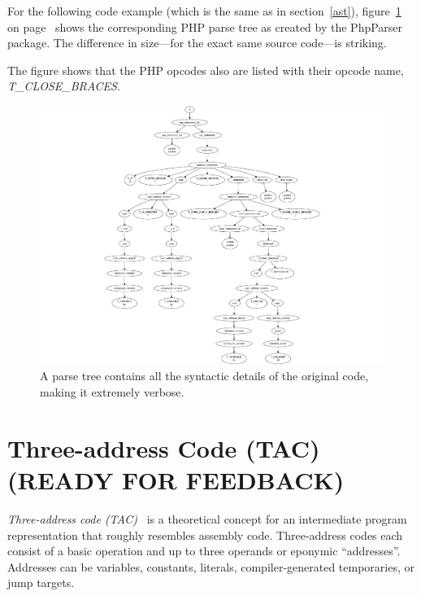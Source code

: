 For the following code example (which is the same as in section~\ref{ast}), figure~\ref{fig:parse-tree} on page~\pageref{fig:parse-tree} shows the corresponding PHP parse tree as created by the PhpParser package. The difference in size---for the exact same source code---is striking.

The figure shows that the PHP opcodes also are listed with their opcode name, \eg \emph{T\_CLOSE\_BRACES}.


\begin{figure}[htb]
  \begin{center}
    \includegraphics[scale=0.7]{images/parse-tree}
    \caption{A parse tree contains all the syntactic details of the original code, making it extremely verbose.}
    \label{fig:parse-tree}
  \end{center}
\end{figure}



\section{Three-address Code (TAC) (READY FOR FEEDBACK)}
\label{tac}

\emph{Three-address code (TAC)}~\cite{compiler-construction, compilers} is a theoretical concept for an intermediate program representation that roughly resembles assembly code. Three-address codes each consist of a basic operation and up to three operands or eponymic ``addresses''. Addresses can be variables, constants, literals, compiler-generated temporaries, or jump targets.

